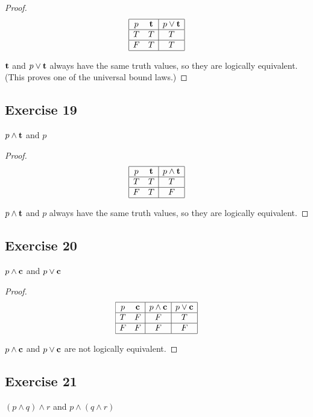 \documentclass[14pt]{extarticle}
\newcommand{\true}{{\bf t}}
\newcommand{\false}{{\bf c}}
\begin{document}
\begin{proof}
$$
\begin{array}{|cc|c|}
\hline
p & \true & p \vee \true \\
\hline
T & T & T \\
\hline
F & T & T \\
\hline
\end{array}
$$

$\true$ and $p \vee \true$ always have the same truth values, so they are
logically equivalent. (This proves one of the universal bound laws.)

\end{proof}

\subsection{Exercise 19}
$p \wedge \true$ and $p$

\begin{proof}
$$
\begin{array}{|cc|c|}
\hline
p & \true & p \wedge \true \\
\hline
T & T & T \\
\hline
F & T & F \\
\hline
\end{array}
$$

$p \wedge \true$ and $p$ always have the same truth values, so they are
logically equivalent.
\end{proof}

\subsection{Exercise 20}
$p \wedge \false$ and $p \vee \false$

\begin{proof}
$$
\begin{array}{|cc|c|c|}
\hline
p & \false & p \wedge \false & p \vee \false \\
\hline
T & F & F & T \\
\hline
F & F & F & F \\
\hline
\end{array}
$$

$p \wedge \false$ and $p \vee \false$ are not logically equivalent.
\end{proof}

\subsection{Exercise 21}
$(p \wedge q) \wedge r$ and $p \wedge (q \wedge r)$
\end{document}
